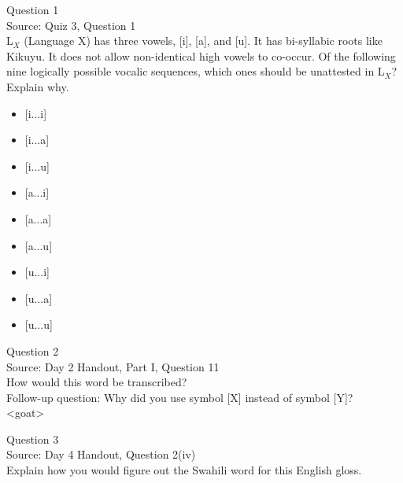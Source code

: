 \documentclass[12pt]{article}
\begin{document}
\begin{center}
\textbf{{\color{blue}{\HUGE START OF EXAM\\}}}

\textbf{{\color{blue}{\HUGE Student ID: 9657\\}}}

\textbf{{\color{blue}{\HUGE 1:45 - 2:00 PM\\}}}

\end{center}
\newpage

{\large Question 1}\\

Source: Quiz 3, Question 1\\

L$_X$ (Language X) has three vowels, [i], [a], and [u]. It has bi-syllabic roots like Kikuyu. It does not allow non-identical high vowels to co-occur. Of the following nine logically possible vocalic sequences, which ones should be unattested in L$_X$? Explain why.\\

\begin{itemize} \item {[i...i]} \item {[i...a]} \item {[i...u]} \item {[a...i]} \item {[a...a]} \item {[a...u]} \item {[u...i]} \item {[u...a]} \item {[u...u]} \end{itemize}


\newpage

{\large Question 2}\\

Source: Day 2 Handout, Part I, Question 11\\

How would this word be transcribed?\\ Follow-up question: Why did you use symbol [X] instead of symbol [Y]?\\

<goat>


\newpage

{\large Question 3}\\

Source: Day 4 Handout, Question 2(iv)\\

Explain how you would figure out the Swahili word for this English gloss.\\
\end{document}

